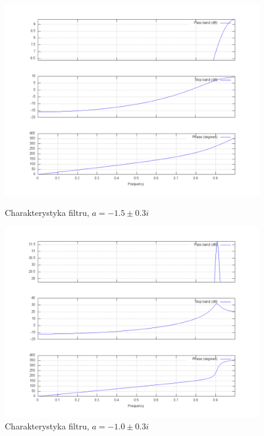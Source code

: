 \documentclass[wide,a4paper,titlepage,12pt]{mwart}
\begin{document}
  \begin{figure}[htbp]
    \begin{center}
      \includegraphics[scale=.3]{out/fig31.png}
      \caption{\label{fig31} Charakterystyka filtru, $a=-1.5\pm0.3i$}
      \includegraphics[scale=.3]{out/fig32.png}
      \caption{\label{fig32} Charakterystyka filtru, $a=-1.0\pm0.3i$}

    \end{center}
  \end{figure}
\end{document}
